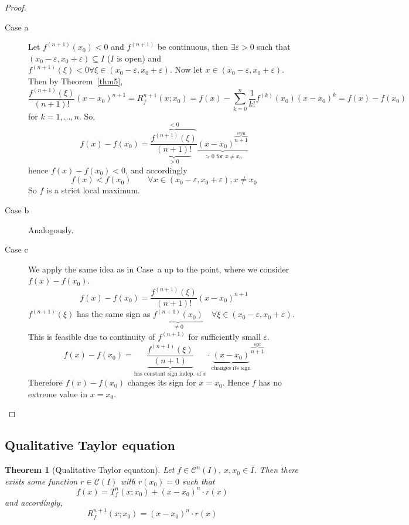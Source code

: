\documentclass{article}
\newtheorem{theorem}{Theorem}  \numberwithin{theorem}{section}
\begin{document}
\begin{proof}
  \begin{description}
    \item[Case a]
      Let $f^{(n+1)}(x_0) < 0$ and $f^{(n+1)}$ be continuous,
      then $\exists \varepsilon > 0$ such that $(x_0 - \varepsilon, x_0 + \varepsilon) \subseteq I$ ($I$ is open)
      and $f^{(n+1)}(\xi) < 0 \forall \xi \in (x_0 - \varepsilon, x_0 + \varepsilon)$.
      Now let $x \in (x_0 - \varepsilon, x_0 + \varepsilon)$.
      Then by Theorem~\ref{thm5},
      \[ \frac{f^{(n+1)}(\xi)}{(n+1)!} (x - x_0)^{n+1} = R_f^{n+1}(x; x_0) = f(x) - \sum_{k=0}^n \frac{1}{k!} f^{(k)}(x_0) (x - x_0)^k = f(x) - f(x_0) \]
      for $k = 1, \dots, n$. So,
      \[ f(x) - f(x_0) = \frac{\overbrace{f^{(n+1)}(\xi)}^{< 0}}{\underbrace{(n+1)!}_{> 0}} \underbrace{(x - x_0)^{\overbrace{n+1}^{\text{even}}}}_{> 0 \text{ for } x \neq x_0} \]
      hence $f(x) - f(x_0) < 0$, and accordingly
      \[ f(x) < f(x_0) \qquad \forall x \in (x_0 - \varepsilon, x_0 + \varepsilon), x \neq x_0 \]
      So $f$ is a strict local maximum.
    \item[Case b] Analogously.
    \item[Case c] We apply the same idea as in Case~a up to the point, where we consider $f(x) - f(x_0)$.
      \[ f(x) - f(x_0) = \frac{f^{(n+1)}(\xi)}{(n+1)!} (x - x_0)^{n+1} \]
      $f^{(n+1)}(\xi)$ has the same sign as $\underbrace{f^{(n+1)}(x_0)}_{\neq 0} \quad \forall \xi \in (x_0 - \varepsilon, x_0 + \varepsilon)$.
      This is feasible due to continuity of $f^{(n+1)}$ for sufficiently small $\varepsilon$.
      \[
        f(x) - f(x_0)
        = \underbrace{\frac{f^{(n+1)}(\xi)}{(n+1)}}_{\text{has constant sign indep. of } x} \cdot {\underbrace{(x - x_0)}_{\text{changes its sign}}}^{\overbrace{n+1}^{\text{odd}}}
      \]
      Therefore $f(x) - f(x_0)$ changes its sign for $x = x_0$. Hence $f$ has no extreme value in $x = x_0$.
  \end{description}
\end{proof}

\subsection{Qualitative Taylor equation}

\begin{theorem}[Qualitative Taylor equation]
  Let $f \in \mathcal C^n(I)$, $x, x_0 \in I$. Then there exists some function $r \in \mathcal C(I)$ with $r(x_0) = 0$ such that
  \[ f(x) = T_f^n(x; x_0) + (x - x_0)^n \cdot r(x) \]
  and accordingly,
  \[ R_f^{n+1}(x; x_0) = (x - x_0)^n \cdot r(x) \]
\end{theorem}
\end{document}
